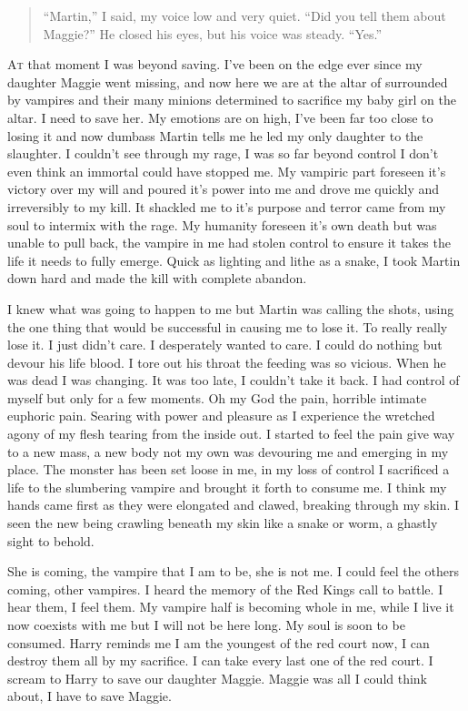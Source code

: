 
\begin{quote}
	``Martin,” I said, my voice low and very quiet. “Did you tell them about Maggie?”
	He closed his eyes, but his voice was steady. “Yes.”
\end{quote}

\lettrine[lines=2,lraise=0]{A}t that moment I was beyond saving. I've been on the edge ever since my daughter Maggie went missing, and now here we are at the altar of \chichenitza surrounded by vampires and their many minions determined to sacrifice my baby girl on the altar. I need to save her. 
My emotions are on high, I've been far too close to losing it and now dumbass Martin tells me he led my only daughter to the slaughter. I couldn't see through my rage, I was so far beyond control I don't even think an immortal could have stopped me. My vampiric part foreseen it's victory over my will and poured it's power into me and drove me quickly and irreversibly to my kill. It shackled me to it's purpose and terror came from my soul to intermix with the rage. My humanity foreseen it's own death but was unable to pull back, the vampire in me had stolen control to ensure it takes the life it needs to fully emerge. Quick as lighting and lithe as a snake, I took Martin down hard and made the kill with complete abandon.

I knew what was going to happen to me but Martin was calling the shots, using the one thing that would be successful in causing me to lose it. To really really lose it. I just didn't care. I desperately wanted to care. I could do nothing but devour his life blood. I tore out his throat the feeding was so vicious. When he was dead I was changing. It was too late, I couldn't take it back. I had control of myself but only for a few moments. Oh my God the pain, horrible intimate euphoric pain. Searing with power and pleasure as I experience the wretched agony of my flesh tearing from the inside out. I started to feel the pain give way to a new mass, a new body not my own was devouring me and emerging in my place. The monster has been set loose in me, in my loss of control I sacrificed a life to the slumbering vampire and brought it forth to consume me. I think my hands came first as they were elongated and clawed, breaking through my skin. I seen the new being crawling beneath my skin like a snake or worm, a ghastly sight to behold.

She is coming, the vampire that I am to be, she is not me. I could feel the others coming, other vampires. I heard the memory of the Red Kings call to battle. I hear them, I feel them. My vampire half is becoming whole in me, while I live it now coexists with me but I will not be here long. My soul is soon to be consumed. Harry reminds me I am the youngest of the red court now, I can destroy them all by my sacrifice. I can take every last one of the red court. I scream to Harry to save our daughter Maggie. Maggie was all I could think about, I have to save Maggie.

